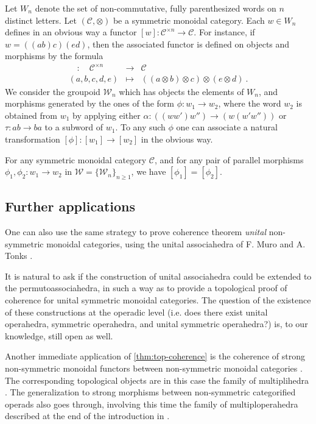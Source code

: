 Let $W_n$ denote the set of non-commutative, fully parenthesized words on $n$ distinct letters. 
Let $(\mathcal{C}, \otimes)$ be a symmetric monoidal category.
Each $w \in W_n$ defines in an obvious way a functor $[w] : \mathcal{C}^{\times n} \to \mathcal{C}$.
For instance, if $w=((ab)c)(ed)$, then the associated functor is defined on objects and morphisms by the formula
\begin{eqnarray*}
    [w] \quad : \quad \mathcal{C}^{\times n} & \to & \mathcal{C} \\
    (a,b,c,d,e) & \mapsto & ((a \otimes b) \otimes c)\otimes (e \otimes d) \ .
\end{eqnarray*}
We consider the groupoid $\mathcal{W}_n$ which has objects the elements of $W_n$, and morphisms generated by the ones of the form $\phi : w_1 \to w_2$, where the word $w_2$ is obtained from $w_1$ by applying either $\alpha : ((ww')w'') \to (w(w'w''))$ or $\tau : ab \to ba$ to a subword of $w_1$.
To any such $\phi$ one can associate a natural transformation $[\phi] : [w_1] \to [w_2]$ in the obvious way. 

\begin{thm}
    \label{thm:MacLane}
    For any symmetric monoidal category $\mathcal{C}$, and for any pair of parallel morphisms $\phi_1,\phi_2: w_1 \to w_2$ in $\mathcal{W}=\{\mathcal{W}_n\}_{n\geq 1}$, we have $[\phi_1]=[\phi_2]$.
\end{thm}

\subsection{Further applications} 
\label{sec:further}
One can also use the same strategy to prove coherence theorem \emph{unital} non-symmetric monoidal categories, using the unital associahedra of F. Muro and A. Tonks \cite{muroUnitalAssociahedra2014}.

It is natural to ask if the construction of unital associahedra could be extended to the permutoassociahedra, in such a way as to provide a topological proof of coherence for unital symmetric monoidal categories. 
The question of the existence of these constructions at the operadic level (i.e. does there exist unital operahedra, symmetric operahedra, and unital symmetric operahedra?) is, to our knowledge, still open as well. 

Another immediate application of \cref{thm:top-coherence} is the coherence of strong non-symmetric monoidal functors between non-symmetric monoidal categories \cite{epsteinFunctorsTensoredCategories1966}. 
The corresponding topological objects are in this case the family of multiplihedra \cite{Stasheff70,Forcey08}.
The generalization to strong morphisms between non-symmetric categorified operads also goes through, involving this time the family of multiploperahedra described at the end of the introduction in \cite{MazuirLA22}.

